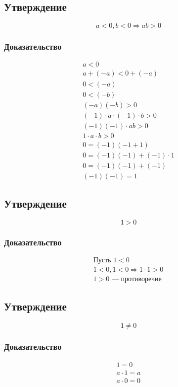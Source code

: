 \documentclass{article}
\begin{document}
\subsection{Утверждение}
\[
    a < 0, b < 0 \Rightarrow ab > 0
\]

\subsubsection{Доказательство}
\begin{gather*}
    a < 0 \\
    a + (-a) < 0 + (-a) \\
    0 < (-a) \\
    0 < (-b) \\
    (-a)(-b) > 0 \\
    (-1) \cdot a \cdot (-1) \cdot b > 0 \\
    (-1)(-1) \cdot ab > 0 \\
    1 \cdot a \cdot b > 0 \\
    0 = (-1)(-1 + 1) \\
    0 = (-1)(-1) + (-1) \cdot 1 \\
    0 = (-1)(-1) + (-1) \\
    (-1)(-1) = 1
\end{gather*}


\subsection{Утверждение}
\[
    1 > 0
\]

\subsubsection{Доказательство}
\begin{gather*}
    \text{Пусть } 1 < 0 \\
    1 < 0, 1 < 0 \Rightarrow 1 \cdot 1 > 0 \\
    1 > 0 \text{ --- противоречие }
\end{gather*}


\subsection{Утверждение}
\[
    1 \neq 0
\]

\subsubsection{Доказательство}
\begin{gather*}
    1 = 0 \\
    a \cdot 1 = a \\
    a \cdot 0 = 0
\end{gather*}
\end{document}
